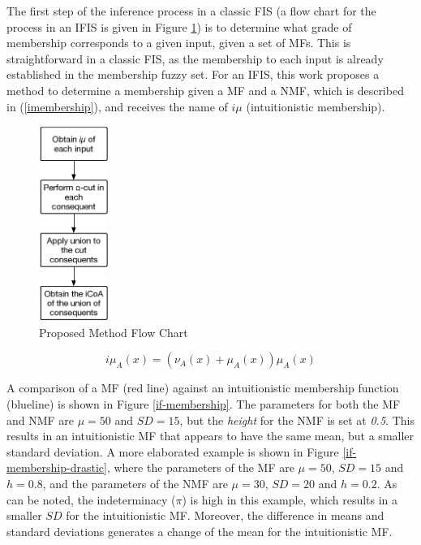 \documentclass[conference]{IEEEtran}
\begin{document}
The first step of the inference process in a classic FIS (a flow chart
for the process in an IFIS is given in Figure \ref{flow-chart}) is to
determine what grade of membership corresponds to a given input, given a set of
MFs. This is straightforward in a classic FIS, as the
membership to each input is already established in the membership
fuzzy set. For an IFIS, this work proposes a method to determine a
membership given a MF and a NMF,
which is described in (\ref{imembership}), and receives the name of
$i\mu$ (intuitionistic membership). %

\begin{figure}[!t]
  \centering
  \includegraphics[height=2.5in]{proposed-method-flow-chart}
  \caption{Proposed Method Flow Chart}
  \label{flow-chart}
\end{figure}

\begin{equation}
  \label{imembership}
  i\mu_{A}(x) = (\nu_{A}(x) + \mu_{A}(x))\mu_{A}(x)
\end{equation}

A comparison of a MF (red line) against an intuitionistic
membership function (blueline) is shown in Figure
\ref{if-membership}. The parameters for both the MF and NMF are $\mu =
50$ and $SD = 15$, but the \textit{height} for the NMF is set at \textit{0.5}. This
results in an intuitionistic MF that appears to have the same mean,
but a smaller standard deviation. A more elaborated example is shown
in Figure \ref{if-membership-drastic}, where the parameters of the MF
are $\mu = 50$, $SD = 15$ and $h = 0.8$, and the parameters of the NMF
are $\mu = 30$, $SD = 20$ and $h = 0.2$. As can be noted, the
indeterminacy ($\pi$) is high in this example, which results in a
smaller $SD$ for the intuitionistic MF. Moreover, the difference in
means and standard deviations generates a change of the mean for the
intuitionistic MF.
\end{document}
